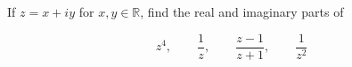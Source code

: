 If $z = x+iy$ for $x,y\in\mathbb{R}$, find the real and imaginary parts of

$$z^4, \qquad \frac1z, \qquad \frac{z-1}{z+1}, \qquad \frac{1}{z^2}$$

\begin{solution}\renewcommand{\qedsymbol}{}\ \\

    

\end{solution}